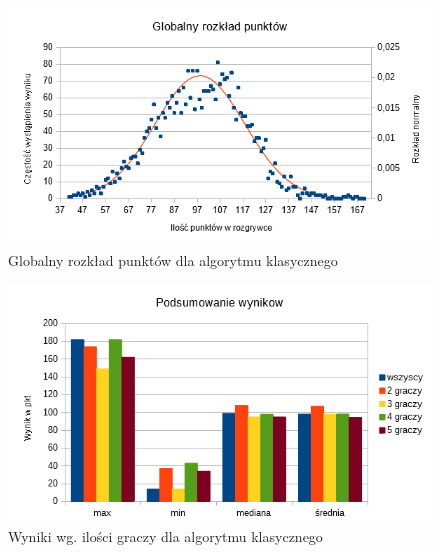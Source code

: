 \documentclass[12pt, oneside]{report}
\begin{document}
\begin{figure}
	\includegraphics[height=0.45\textheight,width=\textwidth]{GaussWykrespunktowglobal.png}
	\caption{Globalny rozkład punktów dla algorytmu klasycznego}
	\label{figure:global_points_algo}
\end{figure}

\begin{figure}
	\includegraphics[height=0.45\textheight,width=\textwidth]{WynikWPkt.png}
	\caption{Wyniki wg. ilości graczy dla algorytmu klasycznego}
	\label{figure:min_max_algo}
\end{figure}
\end{document}
